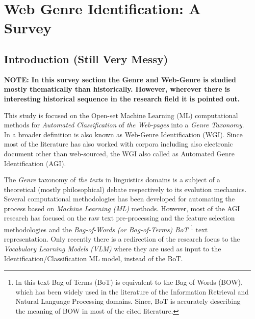 
\chapter{Web Genre Identification: A Survey}

\label{chap:relevant_work}


\newcommand{\keyword}[1]{\textbf{#1}}
\newcommand{\tabhead}[1]{\textbf{#1}}
\newcommand{\code}[1]{\texttt{#1}}
\newcommand{\file}[1]{\texttt{\bfseries#1}}
\newcommand{\option}[1]{\texttt{\itshape#1}}


\section{Introduction (Still Very Messy)}\label{chap:relevant_work:sec:intro}

\textbf{NOTE: In this survey section the Genre and Web-Genre is studied mostly thematically than historically. However, wherever there is interesting historical sequence in the research field it is pointed out.}

This study is focused on the Open-set Machine Learning (ML) computational methods for \textit{Automated Classification} of \textit{the Web-pages} into a \textit{Genre Taxonomy}. In a broader definition is also known as Web-Genre Identification (WGI). Since most of the literature has also worked with corpora including also electronic document other than web-sourced, the WGI also called as Automated Genre Identification (AGI).

The \textit{Genre} taxonomy of \textit{the texts} in linguistics domains is a subject of a theoretical (mostly philosophical) debate respectively to its evolution mechanics. Several computational methodologies has been developed for automating the process based on \textit{Machine Learning (ML)} methods. However, most of the AGI research has focused on the raw text pre-processing and the feature selection methodologies and the \textit{Bag-of-Words (or Bag-of-Terms) BoT }\footnote{In this text Bag-of-Terms (BoT) is equivalent to the Bag-of-Words  (BOW), which has been widely used in the literature of the Information Retrieval and Natural Language Processing domains. Since, BoT is accurately describing the meaning of BOW in most of the cited literature.} text representation. Only recently there is a redirection of the research focus to the \textit{Vocabulary Learning Models (VLM)} where they are used as input to the Identification/Classification ML model, instead of the BoT. 






